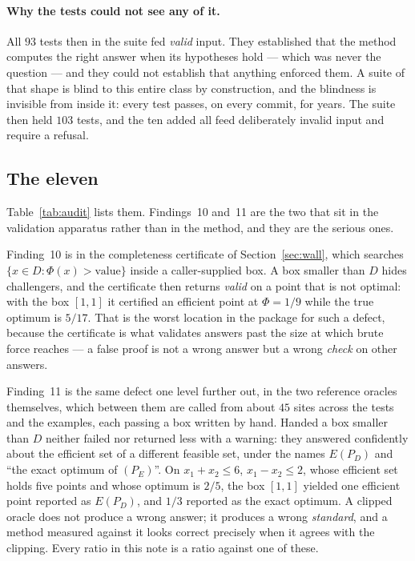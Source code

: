 \documentclass[11pt,a4paper]{article}
\newcommand{\Dset}{D}
\newcommand{\E}{E(P_{\Dset})}
\begin{document}
\paragraph{Why the tests could not see any of it.}
All $93$ tests then in the suite fed \emph{valid} input. They established that
the method computes the right answer when its hypotheses hold --- which was
never the question --- and they could not establish that anything enforced
them. A suite of that shape is blind to this entire class by construction, and
the blindness is invisible from inside it: every test passes, on every commit,
for years. The suite then held $103$ tests, and the ten added all feed
deliberately invalid input and require a refusal.

\subsection{The eleven}

Table~\ref{tab:audit} lists them. Findings~10 and~11 are the two that sit in
the validation apparatus rather than in the method, and they are the serious
ones.

Finding~10 is in the completeness certificate of Section~\ref{sec:wall}, which
searches $\{x \in \Dset : \Phi(x) > \text{value}\}$ inside a caller-supplied
box. A box smaller than $\Dset$ hides challengers, and the certificate then
returns \emph{valid} on a point that is not optimal: with the box $[1,1]$ it
certified an efficient point at $\Phi = 1/9$ while the true optimum is $5/17$.
That is the worst location in the package for such a defect, because the
certificate is what validates answers past the size at which brute force
reaches --- a false proof is not a wrong answer but a wrong \emph{check} on
other answers.

Finding~11 is the same defect one level further out, in the two reference
oracles themselves, which between them are called from about $45$ sites across
the tests and the examples, each passing a box written by hand. Handed a box
smaller than $\Dset$ neither failed nor returned less with a warning: they
answered confidently about the efficient set of a different feasible set, under
the names $\E$ and ``the exact optimum of $(P_E)$''. On
$x_1 + x_2 \leqslant 6$, $x_1 - x_2 \leqslant 2$, whose efficient set holds
five points and whose optimum is $2/5$, the box $[1,1]$ yielded one efficient
point reported as $\E$, and $1/3$ reported as the exact optimum. A clipped
oracle does not produce a wrong answer; it produces a wrong \emph{standard},
and a method measured against it looks correct precisely when it agrees with
the clipping. Every ratio in this note is a ratio against one of these.
\end{document}
